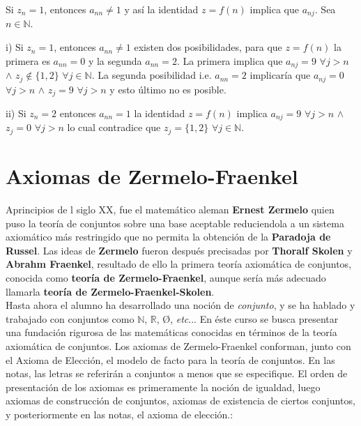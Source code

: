 Si $z_n = 1$, entonces $a_{nn} \neq 1$ y así la identidad $z = f(n)$ implica que $a_{nj}$. Sea $n \in \mathbb{N}$.
\begin{iteritem}
\item i) Si $z_n = 1$, entonces $a_{nn} \neq 1$ existen dos posibilidades, para que $z = f(n)$ la primera es $a_{nn} = 0$
y la segunda $a_{nn} = 2$. La primera implica que $a_{nj} = 9$ $\forall j > n$ $\wedge$ $z_j \notin \{1,2\}$ $\forall j \in \mathbb{N}$.
La segunda posibilidad i.e. $a_{nn} = 2$ implicaría que $a_{nj} = 0$ $\forall j > n$ $\wedge$ $z_j = 9$ $\forall j > n$ y esto último 
no es posible.
\item ii) Si $z_n = 2$ entonces $a_{nn} = 1$ la identidad $z = f(n)$ implica $a_{nj} = 9$ $\forall j > n$ $\wedge$ $z_j = 0$ 
$\forall j > n$ lo cual contradice que $z_j = \{1,2\}$ $\forall j \in \mathbb{N}$. 
\end{iteritem}

\section{Axiomas de Zermelo-Fraenkel}

Aprincipios de l siglo XX, fue el matemático aleman \textbf{Ernest Zermelo} quien puso la teoría de conjuntos sobre una base
aceptable reduciendola a un sistema axiomático más restringido que no permita la obtención de la \textbf{Paradoja de Russel}.
Las ideas de \textbf{Zermelo} fueron después precisadas por \textbf{Thoralf Skolen} y \textbf{Abrahm Fraenkel}, resultado de
ello la primera teoría axiomática de conjuntos, conocida como \textbf{teoría de Zermelo-Fraenkel}, aunque sería más adecuado 
llamarla \textbf{teoría de Zermelo-Fraenkel-Skolen}.\\

Hasta ahora el alumno ha desarrollado una noción de \textit{conjunto}, y se ha
hablado y trabajado con conjuntos como $\mathbb{N}$, $\mathbb{R}$, \O,
\textit{etc}... En éste curso se busca presentar una fundación rigurosa de las
matemáticas conocidas en términos de la teoría axiomática de conjuntos. Los
axiomas de Zermelo-Fraenkel conforman, junto con el Axioma de Elección, el
modelo de facto para la teoría de conjuntos.
En las notas, las letras se referirán a conjuntos a menos que se especifique. El
orden de presentación de los axiomas es primeramente la noción de igualdad,
luego axiomas de construcción de conjuntos, axiomas de existencia de ciertos
conjuntos, y posteriormente en las notas, el axioma de elección.:

